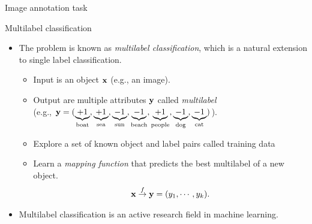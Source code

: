 \documentclass[first=purple,second=dgreen,logo=redexc]{aaltoslides}
\begin{document}
{\begin{frame}{Image annotation task}
{\begin{center}
	\end{center}
	}
\end{frame}


\begin{frame}{Multilabel classification}
	\begin{itemize}
		\item The problem is known as \textit{multilabel classification}, which is a natural extension to single label classification.
		\begin{itemize}
			\footnotesize
			\item Input is an object $\mathbf {x}$ (e.g., an image).
			\item Output are multiple attributes $\mathbf {y}$ called \textit{multilabel}\\
			(e.g., $\mathbf {y}=(\underbrace{+1}_{\text{boat}},\underbrace{+1}_{\text{sea}},\underbrace{-1}_{\text{sun}},\underbrace{-1}_{\text{beach}},\underbrace{+1}_{\text{people}},\underbrace{-1}_{\text{dog}},\underbrace{-1}_{\text{cat}})$).
			\item Explore a set of known object and label pairs called {training data} \\
			\item Learn a \textit{mapping function} that predicts the best multilabel of a new object.
			\begin{align*}
				\mathbf {x}\overset{f}{\rightarrow}\mathbf {y}=(y_1,\cdots,y_k).
			\end{align*}
		\end{itemize}
		\item Multilabel classification is an active research field in machine learning.
	\end{itemize}
\end{frame}

}
\end{document}

